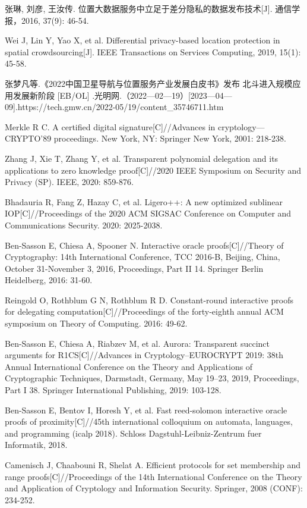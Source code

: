 \documentclass[zihao=-4]{ctexart}
\begin{document}
\begin{thebibliography}{2}
	张琳, 刘彦, 王汝传. 位置大数据服务中立足于差分隐私的数据发布技术[J]. 通信学报，2016, 37(9): 46-54.
	
	Wei J, Lin Y, Yao X, et al. Differential privacy-based location protection in spatial crowdsourcing[J]. IEEE Transactions on Services Computing, 2019, 15(1): 45-58.
	
	张梦凡等.《2022中国卫星导航与位置服务产业发展白皮书》发布 北斗进入规模应用发展新阶段  [EB/OL] .光明网.（2022—02—19）[2023—04—09].https://tech.gmw.cn/2022-05/19/content\_35746711.htm

  Merkle R C. A certified digital signature[C]//Advances in cryptology—CRYPTO’89 proceedings. New York, NY: Springer New York, 2001: 218-238.

  Zhang J, Xie T, Zhang Y, et al. Transparent polynomial delegation and its applications to zero knowledge proof[C]//2020 IEEE Symposium on Security and Privacy (SP). IEEE, 2020: 859-876.

  Bhadauria R, Fang Z, Hazay C, et al. Ligero++: A new optimized sublinear IOP[C]//Proceedings of the 2020 ACM SIGSAC Conference on Computer and Communications Security. 2020: 2025-2038.

  Ben-Sasson E, Chiesa A, Spooner N. Interactive oracle proofs[C]//Theory of Cryptography: 14th International Conference, TCC 2016-B, Beijing, China, October 31-November 3, 2016, Proceedings, Part II 14. Springer Berlin Heidelberg, 2016: 31-60.
  
  Reingold O, Rothblum G N, Rothblum R D. Constant-round interactive proofs for delegating computation[C]//Proceedings of the forty-eighth annual ACM symposium on Theory of Computing. 2016: 49-62.

  Ben-Sasson E, Chiesa A, Riabzev M, et al. Aurora: Transparent succinct arguments for R1CS[C]//Advances in Cryptology–EUROCRYPT 2019: 38th Annual International Conference on the Theory and Applications of Cryptographic Techniques, Darmstadt, Germany, May 19–23, 2019, Proceedings, Part I 38. Springer International Publishing, 2019: 103-128.

  Ben-Sasson E, Bentov I, Horesh Y, et al. Fast reed-solomon interactive oracle proofs of proximity[C]//45th international colloquium on automata, languages, and programming (icalp 2018). Schloss Dagstuhl-Leibniz-Zentrum fuer Informatik, 2018.

  Camenisch J, Chaabouni R, Shelat A. Efficient protocols for set membership and range proofs[C]//Proceedings of the 14th International Conference on the Theory and Application of Cryptology and Information Security. Springer, 2008 (CONF): 234-252.


\end{thebibliography}
\end{document}
